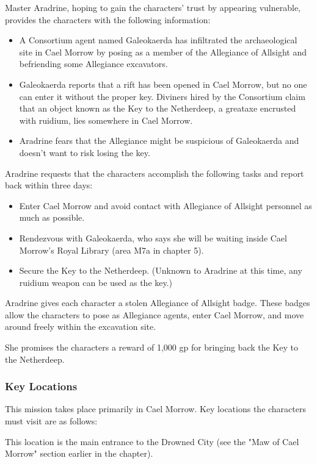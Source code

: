 \documentclass[10pt,a4paper,twoside,bg=print,twocolumn,openany,nodeprecatedcode]{dndbook}
\begin{document}
Master Aradrine, hoping to gain the characters' trust by appearing vulnerable, provides the characters with the following information:


\begin{itemize}
\item A Consortium agent named Galeokaerda has infiltrated the archaeological site in Cael Morrow by posing as a member of the Allegiance of Allsight and befriending some Allegiance excavators.
\item Galeokaerda reports that a rift has been opened in Cael Morrow, but no one can enter it without the proper key. Diviners hired by the Consortium claim that an object known as the Key to the Netherdeep, a greataxe encrusted with ruidium, lies somewhere in Cael Morrow.
\item Aradrine fears that the Allegiance might be suspicious of Galeokaerda and doesn't want to risk losing the key.
\end{itemize}

Aradrine requests that the characters accomplish the following tasks and report back within three days:


\begin{itemize}
\item Enter Cael Morrow and avoid contact with Allegiance of Allsight personnel as much as possible.
\item Rendezvous with Galeokaerda, who says she will be waiting inside Cael Morrow's Royal Library (area M7a in chapter 5).
\item Secure the Key to the Netherdeep. (Unknown to Aradrine at this time, any ruidium weapon can be used as the key.)
\end{itemize}

Aradrine gives each character a stolen Allegiance of Allsight badge. These badges allow the characters to pose as Allegiance agents, enter Cael Morrow, and move around freely within the excavation site.

She promises the characters a reward of 1,000 gp for bringing back the Key to the Netherdeep.

\subsubsection{Key Locations}
This mission takes place primarily in Cael Morrow. Key locations the characters must visit are as follows:


\begin{description}[nolistsep]
\item[Maw of Cael Morrow.]
This location is the main entrance to the Drowned City (see the "Maw of Cael Morrow" section earlier in the chapter).
\end{description}
\end{document}
